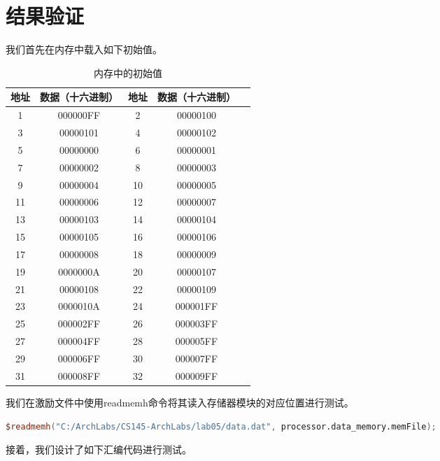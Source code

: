 \documentclass{cumcm}
\numberwithin{equation}{section}
\numberwithin{equation}{subsection}
\begin{document}
\section{结果验证}\label{section4}
我们首先在内存中载入如下初始值。

\begin{table}[htbp]
    \centering
    \begin{tabular}{|c|c|c|c|c|}
        \hline
        地址 & 数据（十六进制） & 地址 & 数据（十六进制）\\ \hline
        1 & 000000FF & 
        2 & 00000100\\
        3 & 00000101 & 
        4 & 00000102\\
        5 & 00000000 &
        6 & 00000001\\
        7 & 00000002 &
        8 & 00000003\\
        9 & 00000004 &
        10 & 00000005\\
        11 & 00000006 &
        12 & 00000007\\
        13 & 00000103 &
        14 & 00000104\\
        15 & 00000105 &
        16 & 00000106\\
        17 & 00000008 &
        18 & 00000009\\
        19 & 0000000A &
        20 & 00000107\\
        21 & 00000108 &
        22 & 00000109\\
        23 & 0000010A &
        24 & 000001FF\\
        25 & 000002FF &
        26 & 000003FF\\
        27 & 000004FF &
        28 & 000005FF\\
        29 & 000006FF &
        30 & 000007FF\\
        31 & 000008FF &
        32 & 000009FF\\
        \hline
    \end{tabular}
    \caption{内存中的初始值}
    \label{tab5}
\end{table}

我们在激励文件中使用readmemh命令将其读入存储器模块的对应位置进行测试。
\begin{lstlisting}[language=verilog]
$readmemh("C:/ArchLabs/CS145-ArchLabs/lab05/data.dat", processor.data_memory.memFile);         
\end{lstlisting}

接着，我们设计了如下汇编代码进行测试。
\end{document}
